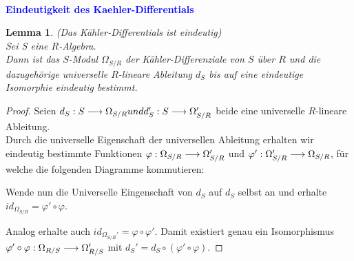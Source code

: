 \documentclass[10pt,a4paper]{report}
\newcounter{Aussage}[chapter]
\newtheorem{lemma}[Aussage]{Lemma}
\newcommand{\functionfront}[3]{\nolinebreak{#1:#2 \longrightarrow #3}}
\newcommand{\divR}[2]{\Omega_{#1/#2}}
\newcommand{\divf}[1]{d_{#1}}
\begin{document}
\ \\
\textcolor{blue}{\textbf{Eindeutigkeit des Kaehler-Differentials}}
\begin{lemma}\label{Eindeutigkeit des Kaehler-Differentials}(Das Kähler-Differentials ist eindeutig)\\
Sei S eine $R$-Algebra.\\
Dann ist das $S$-Modul $\divR{S}{R}$ der Kähler-Differenziale von $S$ über $R$ und die dazugehörige universelle $R$-lineare Ableitung $\divf{S}$ bis auf eine eindeutige Isomorphie eindeutig bestimmt.
\end{lemma}
\begin{proof}
Seien $\functionfront{\divf{S}}{S}{\divR{S}{R}} und \functionfront{\divf{S}'}{S}{\divR{S}{R}'}$ beide eine universelle $R$-lineare Ableitung.\\
Durch die universelle Eigenschaft der universellen Ableitung erhalten wir eindeutig bestimmte Funktionen
$\functionfront{\varphi}{\divR{S}{R}}{\divR{S}{R}'}$ und $\functionfront{\varphi'}{\divR{S}{R}'}{\divR{S}{R}}$, für welche die folgenden Diagramme kommutieren:
\begin{center}
\end{center}
Wende nun die Universelle Eingenschaft von $\divf{S}$ auf $\divf{S}$ selbst an und erhalte $id_{\divR{S}{R}} = \varphi' \circ \varphi$. 
\begin{center}
\end{center}
Analog erhalte auch $id_{\divR{S}{R}'} = \varphi \circ \varphi'$. Damit existiert genau ein Isomorphismus $\functionfront{\varphi' \circ \varphi}{\divR{R}{S}}{\divR{R}{S}'}$ mit $\divf{S}' = \divf{S} \circ (\varphi' \circ \varphi)$.
\end{proof}
\end{document}
